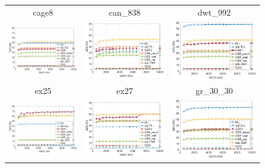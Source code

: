 \begin{figure}[t]
\begin{center}
\begin{tabular}{ccc}
\hline
{\sc cage8} & {\sc can\_838} & {\sc dwt\_992}\\
\includegraphics[width=.30\columnwidth]{plots/single_matrices/GFLOPS/cage8_GFLOPs}
&
\includegraphics[width=.30\columnwidth]{plots/single_matrices/GFLOPS/can_838_GFLOPs}
&
\includegraphics[width=.30\columnwidth]{plots/single_matrices/GFLOPS/dwt_992_GFLOPs}
\\
\hline
{\sc ex25} & {\sc ex27} & {\sc gr\_30\_30}\\
\includegraphics[width=.30\columnwidth]{plots/single_matrices/GFLOPS/ex2_GFLOPs}
&
\includegraphics[width=.30\columnwidth]{plots/single_matrices/GFLOPS/ex27_GFLOPs}
&
\includegraphics[width=.30\columnwidth]{plots/single_matrices/GFLOPS/gr_30_30_GFLOPs}

\end{tabular}
\end{center}
\end{figure}
